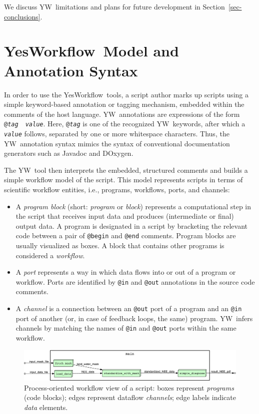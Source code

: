 \documentclass[15]{ijdc-v9}
\newcommand{\YW}{\textsf{YesWorkflow}}
\newcommand{\yw}{\textsf{YW}}
\newcommand{\YWT}{YesWorkflow}
\newcommand{\ywa}[1]{\texttt{\small #1}}
\begin{document}
 \noindent We discuss \yw\ limitations and plans for future
 development in Section~\ref{sec-conclusions}.


\section{\YWT\ Model and Annotation Syntax}\label{sec-ywmodel}

In order to use the \YW\ tools, a script author marks up scripts using
a simple keyword-based annotation or tagging mechanism, embedded
within the comments of the host language. \yw\ annotations are
expressions of the form
\ywa{@\emph{tag}}~\textvisiblespace~\ywa{\emph{value}}. Here,
\ywa{@\emph{tag}} is one of the recognized \yw\ keywords, after which a
\ywa{\emph{value}} follows, separated by one or more whitespace
characters. Thus, the \yw\ annotation syntax mimics the syntax of
conventional documentation generators such as Javadoc and DOxygen.

The \yw\ tool then interprets the embedded, structured comments and
builds a simple workflow model of the script. This model represents
scripts in terms of scientific workflow entities, i.e., programs,
workflows, ports, and channels:

\begin{itemize}
\item A \emph{program block} (short: \emph{program} or \emph{block})
  represents a computational step in the script that receives input
  data and produces (intermediate or final) output data. A program is
  designated in a script by bracketing the relevant code between a
  pair of \ywa{@begin} and \ywa{@end} comments. Program blocks are
  usually visualized as boxes. A block that contains other programs is
  considered a \emph{workflow}. \item A \emph{port} represents a way
  in which data flows into or out of a program or workflow. Ports are
  identified by \ywa{@in} and \ywa{@out} annotations in the source
  code comments.
\item A \emph{channel} is a connection between an \ywa{@out} port
of a program and an \ywa{@in} port of another (or, in case of feedback
loops, the same) program. \yw\ infers
channels by matching the names of \ywa{@in} and \ywa{@out} 
ports within the same workflow.
\end{itemize}

 \begin{figure}[t]
   \centering
   \includegraphics[width=1.0\textwidth]{figures/example_process-crop.pdf}
   \caption{Process-oriented workflow view of a script: boxes
     represent \emph{programs} (code blocks); edges represent dataflow
     \emph{channels}; edge labels indicate \emph{data}
     elements.}
   \label{fig-simple-process}
 \end{figure}
\end{document}
